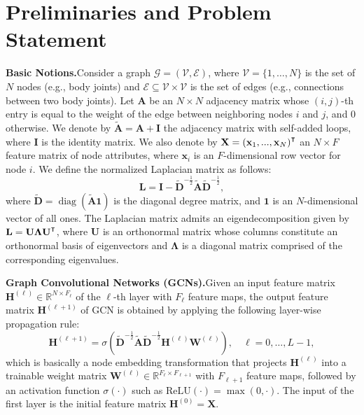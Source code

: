 \documentclass{bmvc2k}
\newcommand{\op}[1]{\operatorname{#1}}
\newcommand{\bg}[1]{\boldsymbol{#1}} \newcommand{\bm}[1]{\mathbf{#1}} \newcommand{\vc}[3]{\overset{#2}{\underset{#3}{#1}}}
\newcommand\T{{\mathpalette\raiseT\intercal}}
\newcommand\raiseT[2]{\setbox0\hbox{$#1{#2}$}\raise\dp0\box0}
\begin{document}
\section{Preliminaries and Problem Statement}
\noindent\textbf{Basic Notions.}\quad Consider a graph $\mathcal{G}=(\mathcal{V},\mathcal{E})$, where $\mathcal{V}=\{1,\ldots,N\}$ is the set of $N$ nodes (e.g., body joints) and $\mathcal{E}\subseteq \mathcal{V}\times\mathcal{V}$ is the set of edges (e.g., connections between two body joints). Let $\bm{A}$ be an $N\times N$ adjacency matrix whose $(i,j)$-th entry is equal to the weight of the edge between neighboring nodes $i$ and $j$, and 0 otherwise. We denote by $\tilde{\bm{A}}=\bm{A}+\bm{I}$ the adjacency matrix with self-added loops, where $\bm{I}$ is the identity matrix. We also denote by $\bm{X}=(\bm{x}_{1},...,\bm{x}_{N})^{\T}$ an $N\times F$ feature matrix of node attributes, where $\bm{x}_{i}$ is an $F$-dimensional row vector for node $i$. We define the normalized Laplacian matrix as follows:
\begin{equation}
\bm{L}=\bm{I}-\tilde{\bm{D}}^{-\frac{1}{2}}\tilde{\bm{A}}\tilde{\bm{D}}^{-\frac{1}{2}},
\end{equation}
where $\tilde{\bm{D}}=\op{diag}(\tilde{\bm{A}}\bm{1})$ is the diagonal degree matrix, and $\bm{1}$ is an $N$-dimensional vector of all ones. The Laplacian matrix admits an eigendecomposition given by $\bm{L}=\bm{U}\bg{\Lambda}\bm{U}^{\T}$, where $\bm{U}$ is an orthonormal matrix whose columns constitute an orthonormal basis of eigenvectors and $\bg{\Lambda}$ is a diagonal matrix comprised of the corresponding eigenvalues.

\medskip\noindent\textbf{Graph Convolutional Networks (GCNs).}\quad Given an input feature matrix $\bm{H}^{(\ell)}\in\mathbb{R}^{N\times F_{\ell}}$ of the $\ell$-th layer with $F_{\ell}$ feature maps, the output feature matrix $\bm{H}^{(\ell+1)}$ of GCN is obtained by applying the following layer-wise propagation rule:
\begin{equation}
\bm{H}^{(\ell+1)}=\sigma(\tilde{\bm{D}}^{-\frac{1}{2}}\tilde{\bm{A}}\tilde{\bm{D}}^{-\frac{1}{2}}\bm{H}^{(\ell)}\bm{W}^{(\ell)}),\quad \ell=0,\dots,L-1,
\label{Eq:AGCNprop}
\end{equation}
which is basically a node embedding transformation that projects $\bm{H}^{(\ell)}$ into a trainable weight matrix $\bm{W}^{(\ell)}\in\mathbb{R}^{F_{\ell}\times F_{\ell+1}}$ with $F_{\ell +1}$ feature maps, followed by an activation function $\sigma(\cdot)$ such as $\text{ReLU}(\cdot)=\max(0,\cdot)$. The input of the first layer is the initial feature matrix $\bm{H}^{(0)}=\bm{X}$.
\end{document}
